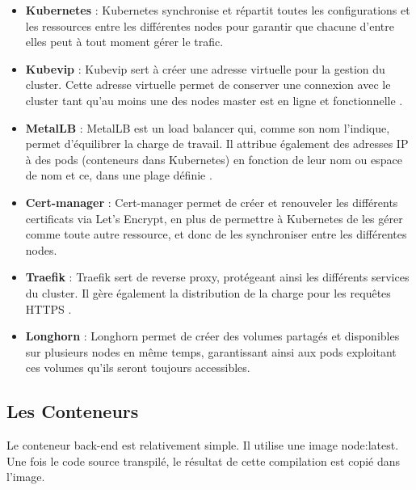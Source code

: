 \begin{itemize}
    \item \textbf{Kubernetes} : Kubernetes synchronise et répartit toutes les configurations et les ressources entre les différentes nodes
    pour garantir que chacune d'entre elles peut à tout moment gérer le trafic.\\

    \item \textbf{Kubevip} : Kubevip sert à créer une adresse virtuelle pour la gestion du cluster.
    Cette adresse virtuelle permet de conserver une connexion avec le cluster tant qu'au moins une des nodes master est en ligne et fonctionnelle .\\

    \item \textbf{MetalLB} : MetalLB est un load balancer qui, comme son nom l'indique, permet d'équilibrer la charge de travail.
    Il attribue également des adresses IP à des pods (conteneurs dans Kubernetes) en fonction de leur nom ou espace de nom et ce, dans une plage définie .\\

    \item \textbf{Cert-manager} : Cert-manager permet de créer et renouveler les différents certificats via Let's Encrypt,
    en plus de permettre à Kubernetes de les gérer comme toute autre ressource, et donc de les synchroniser entre les différentes nodes.\\


    \item \textbf{Traefik} : Traefik sert de reverse proxy, protégeant ainsi les différents services du cluster.
    Il gère également la distribution de la charge pour les requêtes HTTPS .\\
    \item \textbf{Longhorn} : Longhorn permet de créer des volumes partagés et disponibles sur plusieurs nodes en même temps,
    garantissant ainsi aux pods exploitant ces volumes qu'ils seront toujours accessibles.\\
\end{itemize}

\subsection{Les Conteneurs}\label{subsec:les-conteneurs}
Le conteneur back-end est relativement simple.
Il utilise une image node:latest.
Une fois le code source transpilé, le résultat de cette compilation est copié dans l'image.\\

